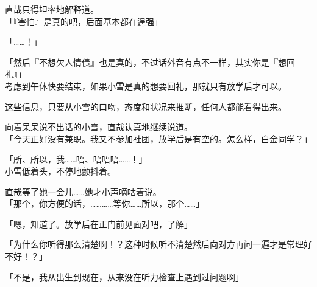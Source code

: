 直哉只得坦率地解释道。\\

「『害怕』是真的吧，后面基本都在逞强」

「……！」

「然后『不想欠人情债』也是真的，不过话外音有点不一样，其实你是『想回礼』」\\

考虑到午休快要结束，如果小雪是真的想要回礼，那就只有放学后才可以。

这些信息，只要从小雪的口吻，态度和状况来推断，任何人都能看得出来。

向着呆呆说不出话的小雪，直哉认真地继续说道。\\

「今天正好没有兼职。我又不参加社团，放学后是有空的。怎么样，白金同学？」

「所、所以，我……唔、唔唔唔……！」\\

小雪低着头，不停地颤抖着。

直哉等了她一会儿……她才小声嘀咕着说。\\

「那个，你方便的话，…………等你……所以，那个……」

「嗯，知道了。放学后在正门前见面对吧，了解」

「为什么你听得那么清楚啊！？这种时候听不清楚然后向对方再问一遍才是常理好不好！？」

「不是，我从出生到现在，从来没在听力检查上遇到过问题啊」

